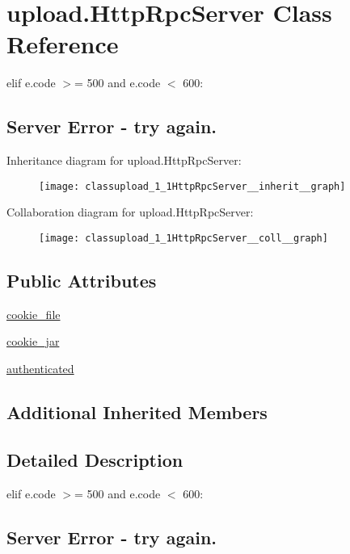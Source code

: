 \hypertarget{classupload_1_1HttpRpcServer}{}\section{upload.\+Http\+Rpc\+Server Class Reference}
\label{classupload_1_1HttpRpcServer}


elif e.\+code $>$= 500 and e.\+code $<$ 600\+: \subsection*{Server Error -\/ try again.} 




Inheritance diagram for upload.\+Http\+Rpc\+Server\+:
\nopagebreak
\begin{figure}[H]
\begin{center}
\leavevmode
\texttt{[image: classupload\_1\_1HttpRpcServer\_\_inherit\_\_graph]}
\end{center}
\end{figure}


Collaboration diagram for upload.\+Http\+Rpc\+Server\+:
\nopagebreak
\begin{figure}[H]
\begin{center}
\leavevmode
\texttt{[image: classupload\_1\_1HttpRpcServer\_\_coll\_\_graph]}
\end{center}
\end{figure}
\subsection*{Public Attributes}
\begin{DoxyCompactItemize}
\item 
\hyperlink{classupload_1_1HttpRpcServer_ad5c1a730c030f9d3b5f70c2e0d8b9a1d}{cookie\+\_\+file}
\item 
\hyperlink{classupload_1_1HttpRpcServer_a1b9c9af7f0a46afd84a9d524782323bf}{cookie\+\_\+jar}
\item 
\hyperlink{classupload_1_1HttpRpcServer_aaa356e2491537dd0d4bfc5b1bb0fec96}{authenticated}
\end{DoxyCompactItemize}
\subsection*{Additional Inherited Members}


\subsection{Detailed Description}
elif e.\+code $>$= 500 and e.\+code $<$ 600\+: \subsection*{Server Error -\/ try again.}

